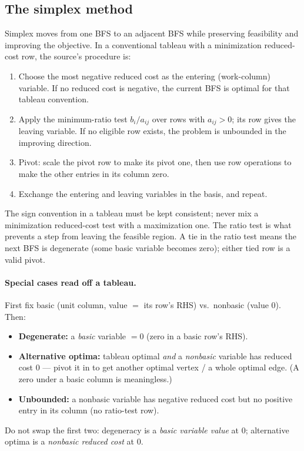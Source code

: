 \documentclass[11pt,a4paper]{article}
\begin{document}
\subsection{The simplex method}
Simplex moves from one BFS to an adjacent BFS while preserving feasibility and improving the objective. In a conventional tableau with a minimization reduced-cost row, the source's procedure is:
\begin{enumerate}
 \item Choose the most negative reduced cost as the entering (work-column) variable. If no reduced cost is negative, the current BFS is optimal for that tableau convention.
 \item Apply the minimum-ratio test $b_i/a_{ij}$ over rows with $a_{ij}>0$; its row gives the leaving variable. If no eligible row exists, the problem is unbounded in the improving direction.
 \item Pivot: scale the pivot row to make its pivot one, then use row operations to make the other entries in its column zero.
 \item Exchange the entering and leaving variables in the basis, and repeat.
\end{enumerate}
The sign convention in a tableau must be kept consistent; never mix a minimization reduced-cost test with a maximization one. The ratio test is what prevents a step from leaving the feasible region. A tie in the ratio test means the next BFS is degenerate (some basic variable becomes zero); either tied row is a valid pivot.

\paragraph{Special cases read off a tableau.} First fix basic (unit column, value $=$ its row's RHS) vs.\ nonbasic (value $0$). Then:
\begin{itemize}
 \item \textbf{Degenerate:} a \emph{basic} variable $=0$ (zero in a basic row's RHS).
 \item \textbf{Alternative optima:} tableau optimal \emph{and} a \emph{nonbasic} variable has reduced cost $0$ --- pivot it in to get another optimal vertex / a whole optimal edge. (A zero under a basic column is meaningless.)
 \item \textbf{Unbounded:} a nonbasic variable has negative reduced cost but no positive entry in its column (no ratio-test row).
\end{itemize}
Do not swap the first two: degeneracy is a \emph{basic variable value} at $0$; alternative optima is a \emph{nonbasic reduced cost} at $0$.
\end{document}
